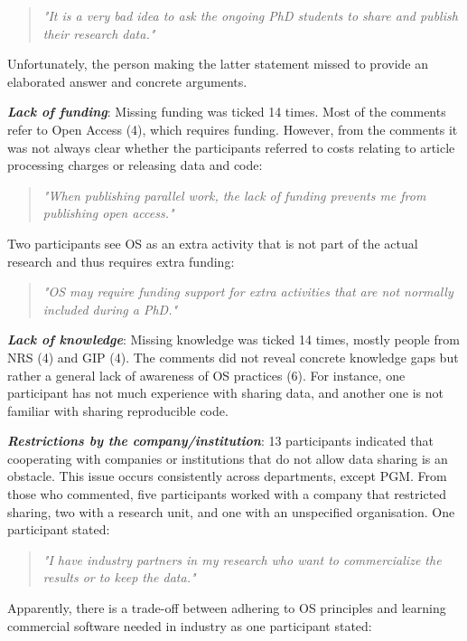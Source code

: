 \documentclass[gc, manuscript]{copernicus}
\begin{document}
\begin{quote}
\textit{"It is a very bad idea to ask the ongoing PhD students to share and publish their research data."}
\end{quote}

Unfortunately, the person making the latter statement missed to provide
an elaborated answer and concrete arguments.

\textit{\textbf{Lack of funding}}: Missing funding was ticked 14 times.
Most of the comments refer to Open Access (4), which requires funding.
However, from the comments it was not always clear whether the
participants referred to costs relating to article processing charges or
releasing data and code:

\begin{quote}
\textit{"When publishing parallel work, the lack of funding prevents me from publishing open access."}
\end{quote}

Two participants see OS as an extra activity that is not part of the
actual research and thus requires extra funding:

\begin{quote}
\textit{"OS may require funding support for extra activities that are not normally included during a PhD."}
\end{quote}

\textit{\textbf{Lack of knowledge}}: Missing knowledge was ticked 14
times, mostly people from NRS (4) and GIP (4). The comments did not
reveal concrete knowledge gaps but rather a general lack of awareness of
OS practices (6). For instance, one participant has not much experience
with sharing data, and another one is not familiar with sharing
reproducible code.

\textit{\textbf{Restrictions by the company/institution}}: 13
participants indicated that cooperating with companies or institutions
that do not allow data sharing is an obstacle. This issue occurs
consistently across departments, except PGM. From those who commented,
five participants worked with a company that restricted sharing, two
with a research unit, and one with an unspecified organisation. One
participant stated:

\begin{quote}
\textit{"I have industry partners in my research who want to commercialize the results or to keep the data."}
\end{quote}

Apparently, there is a trade-off between adhering to OS principles and
learning commercial software needed in industry as one participant
stated:
\end{document}
